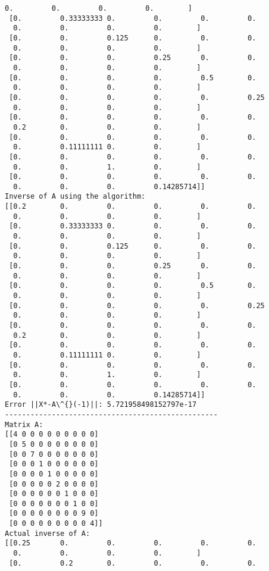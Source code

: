 \documentclass[11pt]{article}
\begin{document}
\begin{Verbatim}[commandchars=\\\{\}]
  0.         0.         0.         0.        ]
 [0.         0.33333333 0.         0.         0.         0.
  0.         0.         0.         0.        ]
 [0.         0.         0.125      0.         0.         0.
  0.         0.         0.         0.        ]
 [0.         0.         0.         0.25       0.         0.
  0.         0.         0.         0.        ]
 [0.         0.         0.         0.         0.5        0.
  0.         0.         0.         0.        ]
 [0.         0.         0.         0.         0.         0.25
  0.         0.         0.         0.        ]
 [0.         0.         0.         0.         0.         0.
  0.2        0.         0.         0.        ]
 [0.         0.         0.         0.         0.         0.
  0.         0.11111111 0.         0.        ]
 [0.         0.         0.         0.         0.         0.
  0.         0.         1.         0.        ]
 [0.         0.         0.         0.         0.         0.
  0.         0.         0.         0.14285714]]
Inverse of A using the algorithm:
[[0.2        0.         0.         0.         0.         0.
  0.         0.         0.         0.        ]
 [0.         0.33333333 0.         0.         0.         0.
  0.         0.         0.         0.        ]
 [0.         0.         0.125      0.         0.         0.
  0.         0.         0.         0.        ]
 [0.         0.         0.         0.25       0.         0.
  0.         0.         0.         0.        ]
 [0.         0.         0.         0.         0.5        0.
  0.         0.         0.         0.        ]
 [0.         0.         0.         0.         0.         0.25
  0.         0.         0.         0.        ]
 [0.         0.         0.         0.         0.         0.
  0.2        0.         0.         0.        ]
 [0.         0.         0.         0.         0.         0.
  0.         0.11111111 0.         0.        ]
 [0.         0.         0.         0.         0.         0.
  0.         0.         1.         0.        ]
 [0.         0.         0.         0.         0.         0.
  0.         0.         0.         0.14285714]]
Error ||X*-A\^{}(-1)||: 5.721958498152797e-17
--------------------------------------------------
Matrix A:
[[4 0 0 0 0 0 0 0 0 0]
 [0 5 0 0 0 0 0 0 0 0]
 [0 0 7 0 0 0 0 0 0 0]
 [0 0 0 1 0 0 0 0 0 0]
 [0 0 0 0 1 0 0 0 0 0]
 [0 0 0 0 0 2 0 0 0 0]
 [0 0 0 0 0 0 1 0 0 0]
 [0 0 0 0 0 0 0 1 0 0]
 [0 0 0 0 0 0 0 0 9 0]
 [0 0 0 0 0 0 0 0 0 4]]
Actual inverse of A:
[[0.25       0.         0.         0.         0.         0.
  0.         0.         0.         0.        ]
 [0.         0.2        0.         0.         0.         0.

\end{Verbatim}
\end{document}

